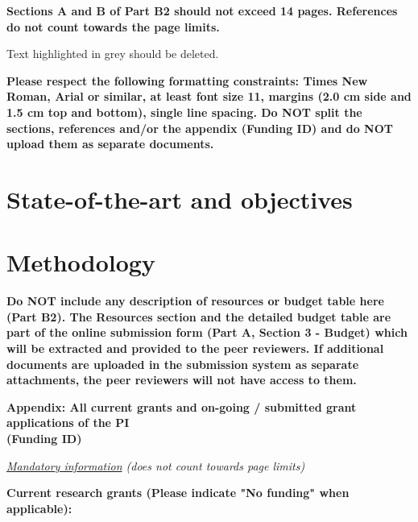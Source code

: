 \documentclass[11pt,timesnewroman,parttwo,draftproposal]{erc-stg}
\begin{document}
\maketitle

\noindent \textbf{Sections A and B of Part B2 should not exceed 14 pages.
References do not count towards the page limits.}

\begin{erccomment}
\medskip
Text highlighted in grey should be deleted.

\textbf{Please respect the following formatting constraints: Times New Roman,
Arial or similar, at least font size 11, margins (2.0 cm side and 1.5 cm top
and bottom), single line spacing. Do NOT split the sections, references and/or
the appendix (Funding ID) and do NOT upload them as separate documents.}
\end{erccomment}

\section{State-of-the-art and objectives}
\label{sc:state}

\section{Methodology}
\label{sc:meth}

\begin{erccomment}
\textbf{
Do NOT include any description of resources or budget table here (Part B2).
The Resources section and the detailed budget table are part of the online
submission form (Part A, Section 3 - Budget) which will be extracted and provided
to the peer reviewers. If additional documents are uploaded in the submission
system as separate attachments, the peer reviewers will not have access to them.
}
\end{erccomment}

\newpage

\begin{center}
\textbf{Appendix: All current grants and on-going / submitted grant applications of the PI} \\

\textbf{(Funding ID)}

\textit{\underline{Mandatory information} (does not count towards page limits)}
\end{center}

\medskip

\noindent \textbf{Current research grants (Please indicate "No funding" when applicable):}
\end{document}
